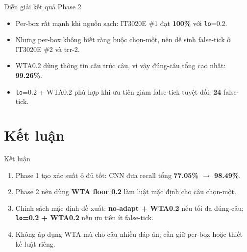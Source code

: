 \documentclass{beamer}
\newcommand{\hl}[1]{\textbf{#1}}
\begin{document}
\begin{frame}{Diễn giải kết quả Phase 2}
\begin{itemize}
    \item Per-box rất mạnh khi nguồn sạch: IT3020E \#1 đạt \hl{100\%} với \texttt{lo}=0.2.
    \item Nhưng per-box không biết ràng buộc chọn-một, nên dễ sinh false-tick ở IT3020E \#2 và trr-2.
    \item WTA0.2 dùng thông tin cấu trúc câu, vì vậy đúng-câu tổng cao nhất: \hl{99.26\%}.
    \item \texttt{lo}=0.2 + WTA0.2 phù hợp khi ưu tiên giảm false-tick tuyệt đối: \hl{24} false-tick.
\end{itemize}
\end{frame}

\section{Kết luận}

\begin{frame}{Kết luận}
\begin{enumerate}
    \item Phase 1 tạo xác suất ô đủ tốt: CNN đưa recall tổng \hl{77.05\% $\to$ 98.49\%}.
    \item Phase 2 nên dùng \hl{WTA floor 0.2} làm luật mặc định cho câu chọn-một.
    \item Chính sách mặc định đề xuất: \hl{no-adapt + WTA0.2} nếu tối đa đúng-câu; \hl{\texttt{lo}=0.2 + WTA0.2} nếu ưu tiên ít false-tick.
    \item Không áp dụng WTA mù cho câu nhiều đáp án; cần giữ per-box hoặc thiết kế luật riêng.
\end{enumerate}
\end{frame}
\end{document}
